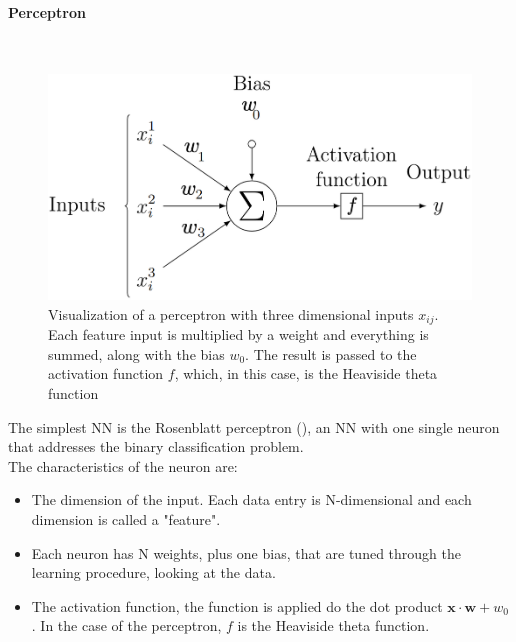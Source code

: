 \paragraph*{Perceptron}\hspace{1cm}\\
\begin{minipage}{\linewidth}
    \begin{minipage}{0.46\linewidth}
        
    \begin{figure}[H]
        \centering
        \includegraphics[width=\linewidth]{fig//chap05-stats/perceptron.png}
        \vspace{0.5cm}
        \caption{Visualization of a perceptron with three dimensional inputs $x_{ij}$. Each feature input is multiplied by a weight and everything is summed, along with the bias $w_0$. The result is passed to the activation function $f$, which, in this case, is the Heaviside theta function}
        \label{fig:perceptron}
    \end{figure}
    \end{minipage}
    \hfill
    \begin{minipage}{0.51\linewidth}
        The simplest NN is the Rosenblatt perceptron \cite{Rosenblatt1958TheBrain} (), an NN with one single neuron that addresses the binary classification problem.\\
        The characteristics of the neuron are:
            \begin{itemize}
                \item The dimension of the input. Each data entry is N-dimensional and each dimension is called a "feature".

                \item Each neuron has N weights, plus one bias, that are tuned through the learning procedure, looking at the data.

                \item The activation function, \ie the function is applied do the dot product $\bm{x}\cdot \bm{w}+w_0$.
                In the case of the perceptron, $f$ is the Heaviside theta function.
            \end{itemize}
    \end{minipage}
    \vspace{0.75cm}
\end{minipage}
